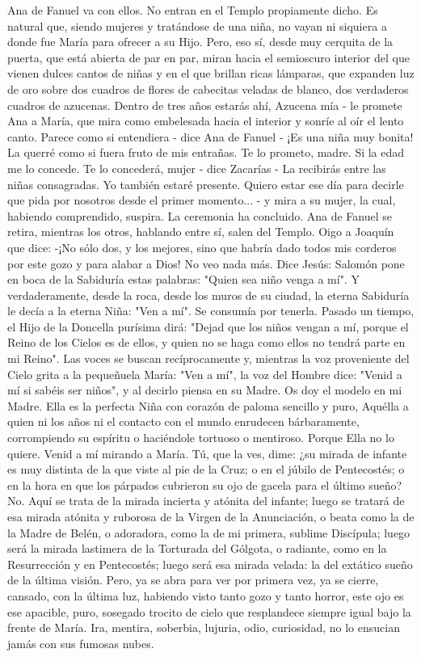 \documentclass[12pt]{book} %
\begin{document}
Ana de Fanuel va con ellos. No entran en el Templo propiamente dicho. Es natural que, siendo mujeres y tratándose de 
una niña, no vayan ni siquiera a donde fue María para ofrecer a su Hijo. Pero, eso sí, desde muy cerquita de la puerta, que está abierta de par en par, miran hacia el semioscuro interior del que vienen dulces cantos de niñas y en el que brillan ricas lámparas, que expanden luz de oro sobre dos cuadros de flores de cabecitas veladas de blanco, dos verdaderos cuadros de azucenas. 
Dentro de tres años estarás ahí, Azucena mía - le promete Ana a María, que mira como embelesada hacia el interior y 
sonríe al oír el lento canto. 
Parece como si entendiera - dice Ana de Fanuel - ¡Es una niña muy bonita! La querré como si fuera fruto de mis 
entrañas. Te lo prometo, madre. Si la edad me lo concede. 
Te lo concederá, mujer - dice Zacarías - La recibirás entre las niñas consagradas. Yo también estaré presente. Quiero 
estar ese día para decirle que pida por nosotros desde el primer momento... - y mira a su mujer, la cual, habiendo comprendido, suspira. 
La ceremonia ha concluido. Ana de Fanuel se retira, mientras los otros, hablando entre sí, salen del Templo. 
Oigo a Joaquín que dice: 
-¡No sólo dos, y los mejores, sino que habría dado todos mis corderos por este gozo y para alabar a Dios! 
No veo nada más. 
Dice Jesús:                            
Salomón pone en boca de la Sabiduría estas palabras: "Quien sea niño venga a mí". Y verdaderamente, desde la roca, 
desde los  muros de su ciudad, la eterna Sabiduría le decía a la eterna Niña: "Ven a mí". Se consumía por tenerla. Pasado un tiempo, el Hijo de la Doncella purísima dirá: "Dejad que los niños vengan a mí, porque el Reino de los Cielos es de ellos, y quien no se haga como ellos no tendrá parte en mi Reino". Las voces se buscan recíprocamente y, mientras la voz proveniente del Cielo grita a la pequeñuela María: "Ven a mí", la voz del Hombre dice: "Venid a mí si sabéis ser niños", y al decirlo piensa en su Madre. 
Os doy el modelo en mi Madre. 
Ella es la perfecta Niña con corazón de paloma sencillo y puro, Aquélla a quien ni los años ni el contacto con el mundo enrudecen bárbaramente, corrompiendo su espíritu o haciéndole tortuoso o mentiroso. Porque Ella no lo quiere. Venid a mí mirando a María. 
Tú, que la ves, dime: ¿su mirada de infante es muy distinta de la que viste al pie de la Cruz; o en el júbilo de Pentecostés; o en la hora en que los párpados cubrieron su ojo de gacela para el último sueño? No. Aquí se trata de la mirada incierta y atónita del infante; luego se tratará de esa mirada atónita y ruborosa de la Virgen de la Anunciación, o beata como la de la Madre de Belén, o adoradora, como la de mi primera, sublime Discípula; luego será la mirada lastimera de la Torturada del Gólgota, o radiante, como en la Resurrección y en Pentecostés; luego será esa mirada velada: la del extático sueño de la última visión. Pero, ya se abra para ver por primera vez, ya se cierre, cansado, con la última luz, habiendo visto tanto gozo y tanto horror, este ojo es ese apacible, puro, sosegado trocito de cielo que resplandece siempre igual bajo la frente de María. Ira, mentira, soberbia, lujuria, odio, curiosidad, no lo ensucian jamás con sus fumosas nubes. 
\end{document}

